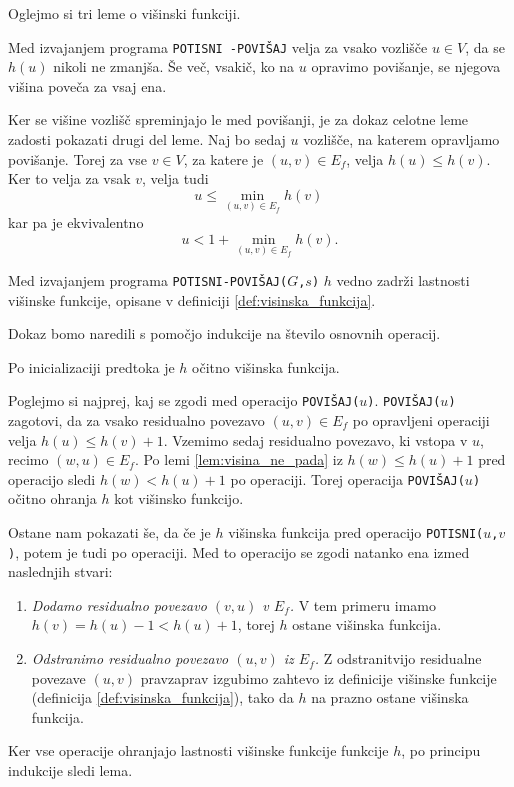 \documentclass[mat1]{fmfdelo}
\begin{document}
Oglejmo si tri leme o višinski funkciji.

\begin{lema}\label{lem:visina_ne_pada}
Med izvajanjem programa \texttt{POTISNI -POVIŠAJ} velja za vsako vozlišče $u \in V$, da se $h(u)$ nikoli ne zmanjša. Še več, vsakič, ko na $u$ opravimo povišanje, se njegova višina poveča za vsaj ena.
\end{lema}

\begin{dokaz}
Ker se višine vozlišč spreminjajo le med povišanji, je za dokaz celotne leme zadosti pokazati drugi del leme. Naj bo sedaj $u$ vozlišče, na katerem opravljamo povišanje. Torej za vse $v \in V$, za katere je $(u,v) \in E_f$, velja $h(u) \leq h(v)$. Ker to velja za vsak $v$, velja tudi \[u \leq \min_{(u,v) \in E_f} h(v)\,\] kar pa je ekvivalentno \[u < 1 + \min_{(u,v) \in E_f} h(v).\]
\end{dokaz}

\begin{lema}\label{lem:h_ostane_visinska}
Med izvajanjem programa \texttt{POTISNI-POVIŠAJ($G$,$s$)} $h$ vedno zadrži lastnosti višinske funkcije, opisane v definiciji \ref{def:visinska_funkcija}.
\end{lema}

\begin{dokaz}
Dokaz bomo naredili s pomočjo indukcije na število osnovnih operacij.

Po inicializaciji predtoka je $h$ očitno višinska funkcija.

Poglejmo si najprej, kaj se zgodi med operacijo \texttt{POVIŠAJ($u$)}. \texttt{POVIŠAJ($u$)} zagotovi, da za vsako residualno povezavo $(u,v) \in E_f$ po opravljeni operaciji velja $h(u) \leq h(v) +1$. Vzemimo sedaj residualno povezavo, ki vstopa v $u$, recimo $(w,u) \in E_f$. Po lemi \ref{lem:visina_ne_pada} iz $h(w) \leq h(u) + 1$ pred operacijo sledi $h(w) < h(u) + 1$ po operaciji. Torej operacija \texttt{POVIŠAJ($u$)} očitno ohranja $h$ kot višinsko funkcijo.

Ostane nam pokazati še, da če je $h$ višinska funkcija pred operacijo \texttt{POTISNI($u$,$v$)}, potem je tudi po operaciji. Med to operacijo se zgodi natanko ena izmed naslednjih stvari:

\begin{enumerate}
\item \textit{Dodamo residualno povezavo $(v,u)$ v $E_f$.} V tem primeru imamo $h(v) = h(u) - 1 < h(u) + 1$, torej $h$ ostane višinska funkcija.
\item \textit{Odstranimo residualno povezavo $(u,v)$ iz $E_f$.} Z odstranitvijo residualne povezave $(u,v)$ pravzaprav izgubimo zahtevo iz definicije višinske funkcije (definicija \ref{def:visinska_funkcija}), tako da $h$ na prazno ostane višinska funkcija.
\end{enumerate}

Ker vse operacije ohranjajo lastnosti višinske funkcije funkcije $h$, po principu indukcije sledi lema.
\end{dokaz}
\end{document}
